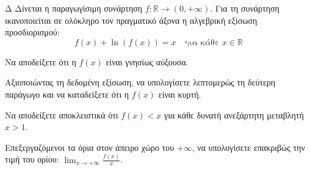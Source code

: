 \begin{thema}{Δ}
Δίνεται η παραγωγίσιμη συνάρτηση $f: \mathbb{R} \to (0, +\infty)$. Για τη συνάρτηση ικανοποιείται σε ολόκληρο τον πραγματικό άξονα η αλγεβρική εξίσωση προσδιορισμού:
\[ f(x) + \ln(f(x)) = x \quad \text{για κάθε } x \in \mathbb{R} \]
\begin{erwthma}
    \item Να αποδείξετε ότι η $f(x)$ είναι γνησίως αύξουσα. 
    \item Αξιοποιώντας τη δεδομένη εξίσωση, να υπολογίσετε λεπτομερώς τη δεύτερη παράγωγο και να καταδείξετε ότι η $f(x)$ είναι κυρτή. 
    \item Να αποδείξετε αποκλειστικά ότι $f(x) < x$ για κάθε δυνατή ανεξάρτητη μεταβλητή $x > 1$. 
    \item Επεξεργαζόμενοι τα όρια στον άπειρο χώρο του $+\infty$, να υπολογίσετε επακριβώς την τιμή του ορίου: $\displaystyle\lim_{x\to+\infty} \frac{f(x)}{x}$. 
\end{erwthma}
\end{thema}
